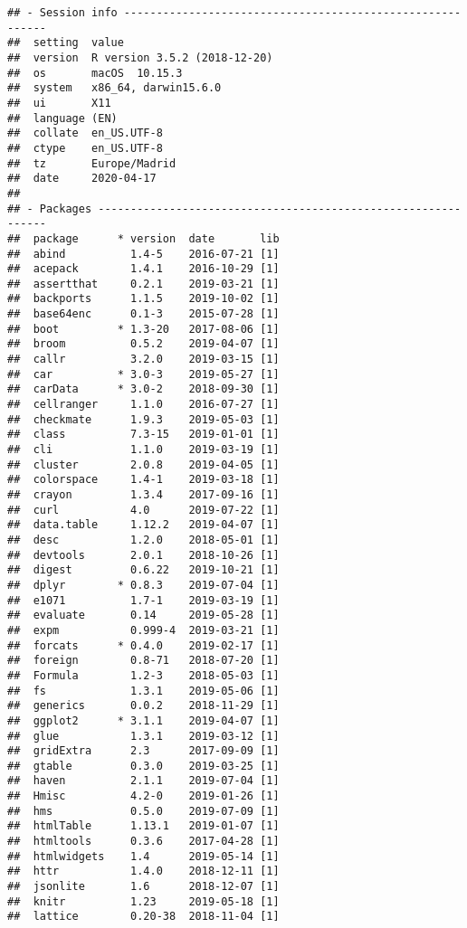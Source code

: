 \documentclass[]{article}
\begin{document}
\begin{verbatim}
## - Session info ----------------------------------------------------------
##  setting  value                       
##  version  R version 3.5.2 (2018-12-20)
##  os       macOS  10.15.3              
##  system   x86_64, darwin15.6.0        
##  ui       X11                         
##  language (EN)                        
##  collate  en_US.UTF-8                 
##  ctype    en_US.UTF-8                 
##  tz       Europe/Madrid               
##  date     2020-04-17                  
## 
## - Packages --------------------------------------------------------------
##  package      * version  date       lib
##  abind          1.4-5    2016-07-21 [1]
##  acepack        1.4.1    2016-10-29 [1]
##  assertthat     0.2.1    2019-03-21 [1]
##  backports      1.1.5    2019-10-02 [1]
##  base64enc      0.1-3    2015-07-28 [1]
##  boot         * 1.3-20   2017-08-06 [1]
##  broom          0.5.2    2019-04-07 [1]
##  callr          3.2.0    2019-03-15 [1]
##  car          * 3.0-3    2019-05-27 [1]
##  carData      * 3.0-2    2018-09-30 [1]
##  cellranger     1.1.0    2016-07-27 [1]
##  checkmate      1.9.3    2019-05-03 [1]
##  class          7.3-15   2019-01-01 [1]
##  cli            1.1.0    2019-03-19 [1]
##  cluster        2.0.8    2019-04-05 [1]
##  colorspace     1.4-1    2019-03-18 [1]
##  crayon         1.3.4    2017-09-16 [1]
##  curl           4.0      2019-07-22 [1]
##  data.table     1.12.2   2019-04-07 [1]
##  desc           1.2.0    2018-05-01 [1]
##  devtools       2.0.1    2018-10-26 [1]
##  digest         0.6.22   2019-10-21 [1]
##  dplyr        * 0.8.3    2019-07-04 [1]
##  e1071          1.7-1    2019-03-19 [1]
##  evaluate       0.14     2019-05-28 [1]
##  expm           0.999-4  2019-03-21 [1]
##  forcats      * 0.4.0    2019-02-17 [1]
##  foreign        0.8-71   2018-07-20 [1]
##  Formula        1.2-3    2018-05-03 [1]
##  fs             1.3.1    2019-05-06 [1]
##  generics       0.0.2    2018-11-29 [1]
##  ggplot2      * 3.1.1    2019-04-07 [1]
##  glue           1.3.1    2019-03-12 [1]
##  gridExtra      2.3      2017-09-09 [1]
##  gtable         0.3.0    2019-03-25 [1]
##  haven          2.1.1    2019-07-04 [1]
##  Hmisc          4.2-0    2019-01-26 [1]
##  hms            0.5.0    2019-07-09 [1]
##  htmlTable      1.13.1   2019-01-07 [1]
##  htmltools      0.3.6    2017-04-28 [1]
##  htmlwidgets    1.4      2019-05-14 [1]
##  httr           1.4.0    2018-12-11 [1]
##  jsonlite       1.6      2018-12-07 [1]
##  knitr          1.23     2019-05-18 [1]
##  lattice        0.20-38  2018-11-04 [1]

\end{verbatim}
\end{document}
